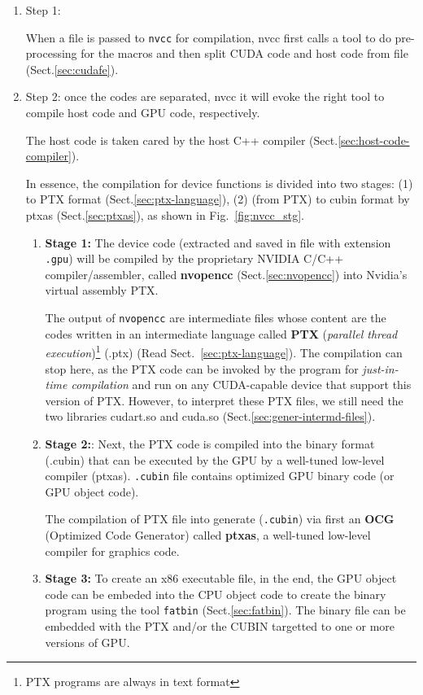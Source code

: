 \begin{enumerate}
  \item Step 1:

When a file is passed to \verb!nvcc! for compilation, nvcc first calls a tool to
do pre-processing for the macros and then split CUDA code and host code from
file (Sect.\ref{sec:cudafe}).
  
  \item Step 2: once the codes are separated, nvcc it will evoke the right tool
  to compile host code and GPU code, respectively.

The host code is taken cared by the host C++ compiler
(Sect.\ref{sec:host-code-compiler}).

In essence, the compilation for device functions is divided into two stages:
(1) to PTX format (Sect.\ref{sec:ptx-language}), (2) (from PTX) to cubin format
by ptxas (Sect.\ref{sec:ptxas}), as shown in Fig.~\ref{fig:nvcc_stg}.
\begin{enumerate}
  
  \item  {\bf Stage 1:} The device code (extracted and saved in file with extension
\verb!.gpu!) will be compiled by the proprietary NVIDIA C/C++
compiler/assembler, called {\bf nvopencc} (Sect.\ref{sec:nvopencc}) into
Nvidia's virtual assembly PTX.

The output of \verb!nvopencc! are intermediate files whose content are the codes
written in an intermediate language called {\bf PTX} ({\it parallel thread
execution})\footnote{PTX programs are always in text format} (.ptx) (Read
Sect.~\ref{sec:ptx-language}).  The compilation can stop here, as the PTX code
can be invoked by the program for {\it just-in-time compilation} and run on any
CUDA-capable device that support this version of PTX. However, to interpret
these PTX files, we still need the two libraries cudart.so and cuda.so
(Sect.\ref{sec:gener-intermd-files}).

  \item {\bf Stage 2:}: Next, the PTX code is compiled into the
binary format (.cubin) that can be executed by the GPU by a well-tuned low-level
compiler (ptxas). \verb!.cubin! file contains optimized GPU binary code (or GPU
object code).

The compilation of PTX file into generate  (\verb!.cubin!) via first an {\bf
OCG}  (Optimized Code Generator) called {\bf ptxas}, a well-tuned low-level 
compiler for graphics code. 
 
  \item {\bf Stage 3:} To create an x86 executable file, in the end, the GPU
  object code can be embeded
into the CPU object code to create the binary program using the tool
\verb!fatbin! (Sect.\ref{sec:fatbin}). The binary file can be embedded with the
PTX and/or the CUBIN targetted to one or more versions of GPU.


\end{enumerate}
\end{enumerate}
